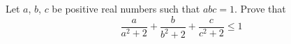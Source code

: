 Let $a$,  $b$,  $c$ be positive real numbers such that $abc=1$. Prove that\[\frac a{a^{2}+2}+\frac b{b^{2}+2}+\frac c{c^{2}+2}\leq 1 \]